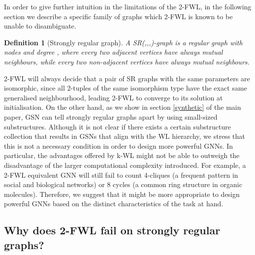 \documentclass{article} \usepackage{iclr2021_conference,times}
\newtheorem{definition}{Definition}[section]
\begin{document}
In order to give further intuition in the limitations of the 2-FWL, in the following section we describe a specific family of graphs which 2-FWL is known to be unable to disambiguate.

\begin{definition}[Strongly regular graph] 
A {\em SR(,,,)-graph} is a regular graph with  nodes and degree , where every two adjacent vertices have always  mutual neighbours, while every two non-adjacent vertices have always  mutual neighbours. 
\end{definition}

2-FWL will always decide that a pair of SR graphs with the same parameters  are isomorphic, since all 2-tuples of the same isomorphism type have the exact same generalised neighbourhood, leading 2-FWL to converge to its solution at initialisation. On the other hand, as we show in section \ref{synthetic} of the main paper, GSN can tell strongly regular graphs apart by using small-sized substructures. Although it is not clear if there exists a certain substructure collection that results in GSNs that align with the WL hierarchy, we stress that this is not a necessary condition in order to design more powerful GNNs. In particular, the advantages offered by k-WL might not be able to outweigh the disadvantage of the larger computational complexity introduced. For example, a 2-FWL equivalent GNN will still fail to count 4-cliques (a frequent pattern in social and biological networks) or 8 cycles (a common ring structure in organic molecules).  Therefore, we suggest that it might be more appropriate to design powerful GNNs based on the distinct characteristics of the task at hand.


\subsection{Why does 2-FWL fail on strongly regular graphs?}\label{sr_graphs_wl}
\end{document}
